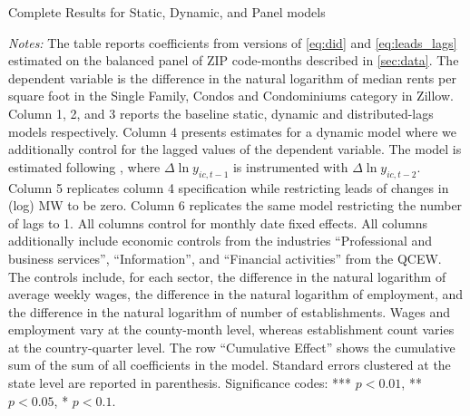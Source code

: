 \begin{table}[h!]\centering
	\caption{Complete Results for Static, Dynamic, and Panel models}
	\label{tab:horse_race_ab}
	\resizebox{\textwidth}{!}{
	
	}
	\begin{minipage}{0.95\textwidth} \footnotesize
		\vspace{3mm} 
		\textit{Notes:} The table reports coefficients from versions of \autoref{eq:did} 
		and	\autoref{eq:leads_lags} estimated on the balanced panel of ZIP code-months
		described in \autoref{sec:data}. The dependent variable is the difference in the 
		natural logarithm of median	rents per square foot in the Single Family, Condos and 
		Condominiums category in Zillow. Column 1, 2, and 3 reports the baseline static, 
		dynamic and distributed-lags models respectively. Column 4 presents estimates for 
		a dynamic model where we additionally control for the lagged values of the dependent 
		variable. The model is estimated following \textcite{ArellanoBond1991},	where 
		$\Delta \ln y_{ic, t-1}$ is instrumented with $\Delta \ln y_{ic, t-2}$. Column 5 
		replicates column 4 specification while restricting leads of changes in (log) MW to 
		be zero. Column 6 replicates the same model restricting the number of lags to 1.
		All columns control for monthly date fixed effects. All columns additionally  
		include economic controls from the industries ``Professional and business services'', 
		``Information'', and ``Financial activities'' from the QCEW. The controls include, 
		for each sector, the difference in the natural logarithm of average weekly wages, 
		the difference in the natural logarithm of employment, and the difference in the 
		natural logarithm of number of establishments. Wages and employment vary at the 
		county-month level,	whereas establishment count varies at the country-quarter level. 
		The row ``Cumulative Effect'' shows the cumulative sum of the sum of all coefficients
		in the model. 
		Standard errors clustered at the state level are reported in parenthesis. Significance 
		codes: *** $p < 0.01$, ** $p < 0.05$, * $p < 0.1$.
	\end{minipage}
\end{table}


